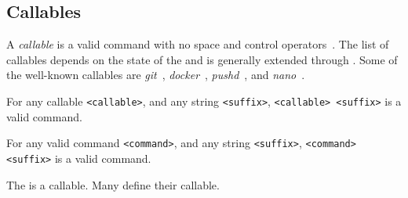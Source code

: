 \subsection{Callables}\label{callables}\label{callable}

A \emph{callable} is a valid command with no space and control operators~\cite{control_operators}. The list of callables depends on the state of the  and is generally extended through . Some of the well-known callables are \emph{git}~\cite{git}, \emph{docker}~\cite{docker}, \emph{pushd}~\cite{pushd}, and \emph{nano}~\cite{nano}. 

\begin{theorem}
For any callable \texttt{<callable>}, and any string \texttt{<suffix>}, \texttt{<callable> <suffix>} is a valid command.
\end{theorem}

\begin{theorem}
For any valid command \texttt{<command>}, and any string \texttt{<suffix>}, \texttt{<command> <suffix>} is a valid command.
\end{theorem}

The  is a callable. Many  define their callable. 